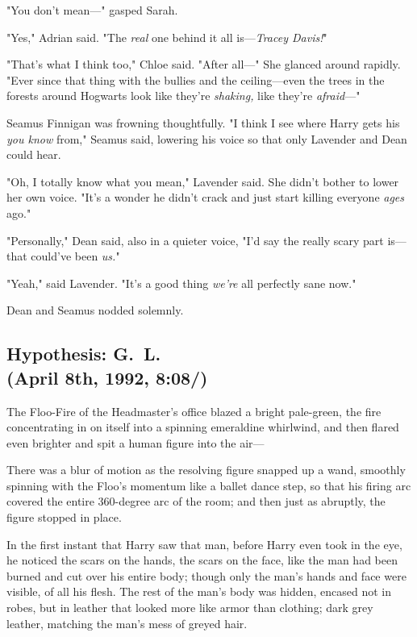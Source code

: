 "You don't mean\mbox{---}" gasped Sarah.

"Yes," Adrian said. "The \emph{real} one behind it all is---\emph{Tracey
Davis!}"

"That's what I think too," Chloe said. "After all\mbox{---}" She glanced around
rapidly. "Ever since that thing with the bullies and the ceiling---even the
trees in the forests around Hogwarts look like they're \emph{shaking,} like
they're \emph{afraid}\mbox{---}"

Seamus Finnigan was frowning thoughtfully. "I think I see where Harry gets
his{\el} \emph{you know{\el}} from," Seamus said, lowering his voice so
that only Lavender and Dean could hear.

"Oh, I totally know what you mean," Lavender said. She didn't bother to lower
her own voice. "It's a wonder he didn't crack and just start killing everyone
\emph{ages} ago."

"Personally," Dean said, also in a quieter voice, "I'd say the really scary
part is---that could've been \emph{us.}"

"Yeah," said Lavender. "It's a good thing \emph{we're} all perfectly sane now."

Dean and Seamus nodded solemnly.
\sbreak
\vspace{-2\baselineskip}
\subsection{Hypothesis: G.~L.\\
(April 8th, 1992, 8:08\PM/)}

The Floo-Fire of the Headmaster's office blazed a bright pale-green, the fire
concentrating in on itself into a spinning emeraldine whirlwind, and then
flared even brighter and spit a human figure into the air---

There was a blur of motion as the resolving figure snapped up a wand, smoothly
spinning with the Floo's momentum like a ballet dance step, so that his firing
arc covered the entire 360-degree arc of the room; and then just as abruptly,
the figure stopped in place.

In the first instant that Harry saw that man, before Harry even took in the
eye, he noticed the scars on the hands, the scars on the face, like the man had
been burned and cut over his entire body; though only the man's hands and face
were visible, of all his flesh. The rest of the man's body was hidden, encased
not in robes, but in leather that looked more like armor than clothing; dark
grey leather, matching the man's mess of greyed hair.

